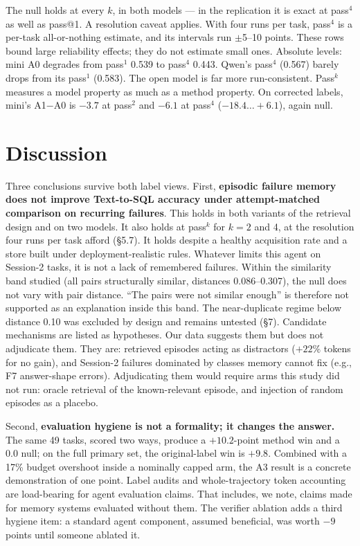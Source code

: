 \documentclass[sigconf, nonacm]{acmart}
\begin{document}
The null holds at every $k$, in both models --- in the replication it is exact at pass$^4$ as well as pass@1. A resolution caveat applies. With four runs per task, pass$^4$ is a per-task all-or-nothing estimate, and its intervals run $\pm$5--10 points. These rows bound large reliability effects; they do not estimate small ones. Absolute levels: mini A0 degrades from pass$^1$ 0.539 to pass$^4$ 0.443. Qwen's pass$^4$ (0.567) barely drops from its pass$^1$ (0.583). The open model is far more run-consistent. Pass$^k$ measures a model property as much as a method property. On corrected labels, mini's A1$-$A0 is $-3.7$ at pass$^2$ and $-6.1$ at pass$^4$ ($-18.4\ldots+6.1$), again null.

\section{Discussion}

Three conclusions survive both label views. First, \textbf{episodic failure memory does not improve Text-to-SQL accuracy under attempt-matched comparison on recurring failures}. This holds in both variants of the retrieval design and on two models. It also holds at pass$^k$ for $k = 2$ and 4, at the resolution four runs per task afford (\S5.7). It holds despite a healthy acquisition rate and a store built under deployment-realistic rules. Whatever limits this agent on Session-2 tasks, it is not a lack of remembered failures. Within the similarity band studied (all pairs structurally similar, distances 0.086--0.307), the null does not vary with pair distance. ``The pairs were not similar enough'' is therefore not supported as an explanation inside this band. The near-duplicate regime below distance 0.10 was excluded by design and remains untested (\S7). Candidate mechanisms are listed as hypotheses. Our data suggests them but does not adjudicate them. They are: retrieved episodes acting as distractors ($+22\%$ tokens for no gain), and Session-2 failures dominated by classes memory cannot fix (e.g., F7 answer-shape errors). Adjudicating them would require arms this study did not run: oracle retrieval of the known-relevant episode, and injection of random episodes as a placebo.

Second, \textbf{evaluation hygiene is not a formality; it changes the answer.} The same 49 tasks, scored two ways, produce a $+10.2$-point method win and a 0.0 null; on the full primary set, the original-label win is $+9.8$. Combined with a 17\% budget overshoot inside a nominally capped arm, the A3 result is a concrete demonstration of one point. Label audits and whole-trajectory token accounting are load-bearing for agent evaluation claims. That includes, we note, claims made for memory systems evaluated without them. The verifier ablation adds a third hygiene item: a standard agent component, assumed beneficial, was worth $-9$ points until someone ablated it.
\end{document}
